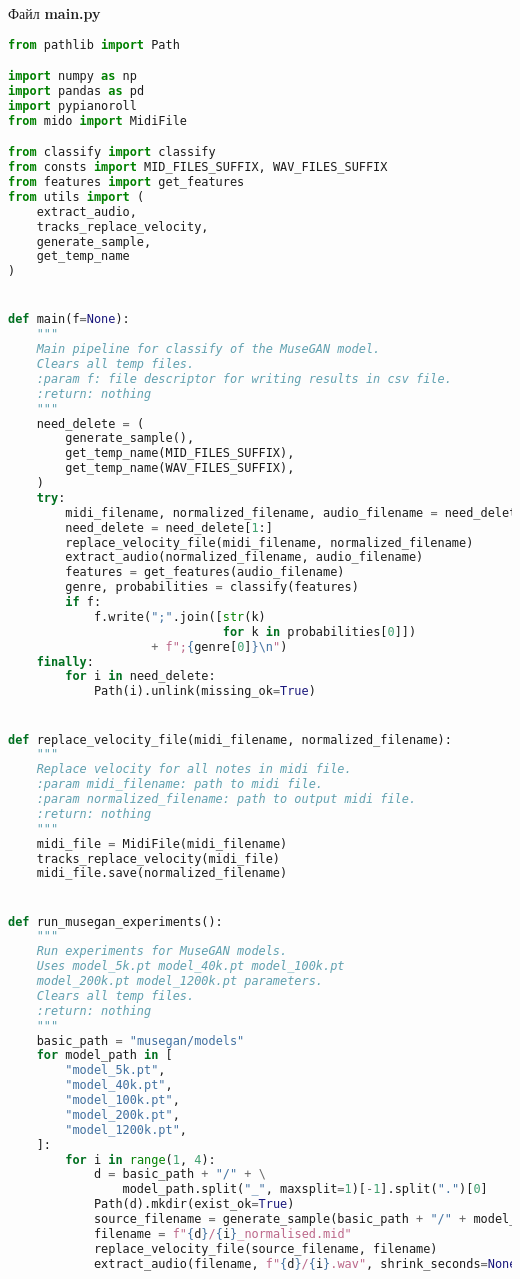 Файл \textbf{main.py}

\begin{lstlisting}[language=Python]
from pathlib import Path

import numpy as np
import pandas as pd
import pypianoroll
from mido import MidiFile

from classify import classify
from consts import MID_FILES_SUFFIX, WAV_FILES_SUFFIX
from features import get_features
from utils import (
    extract_audio,
    tracks_replace_velocity,
    generate_sample,
    get_temp_name
)


def main(f=None):
    """
    Main pipeline for classify of the MuseGAN model.
    Clears all temp files.
    :param f: file descriptor for writing results in csv file.
    :return: nothing
    """
    need_delete = (
        generate_sample(),
        get_temp_name(MID_FILES_SUFFIX),
        get_temp_name(WAV_FILES_SUFFIX),
    )
    try:
        midi_filename, normalized_filename, audio_filename = need_delete
        need_delete = need_delete[1:]
        replace_velocity_file(midi_filename, normalized_filename)
        extract_audio(normalized_filename, audio_filename)
        features = get_features(audio_filename)
        genre, probabilities = classify(features)
        if f:
            f.write(";".join([str(k)
                              for k in probabilities[0]])
                    + f";{genre[0]}\n")
    finally:
        for i in need_delete:
            Path(i).unlink(missing_ok=True)


def replace_velocity_file(midi_filename, normalized_filename):
    """
    Replace velocity for all notes in midi file.
    :param midi_filename: path to midi file.
    :param normalized_filename: path to output midi file.
    :return: nothing
    """
    midi_file = MidiFile(midi_filename)
    tracks_replace_velocity(midi_file)
    midi_file.save(normalized_filename)


def run_musegan_experiments():
    """
    Run experiments for MuseGAN models.
    Uses model_5k.pt model_40k.pt model_100k.pt
    model_200k.pt model_1200k.pt parameters.
    Clears all temp files.
    :return: nothing
    """
    basic_path = "musegan/models"
    for model_path in [
        "model_5k.pt",
        "model_40k.pt",
        "model_100k.pt",
        "model_200k.pt",
        "model_1200k.pt",
    ]:
        for i in range(1, 4):
            d = basic_path + "/" + \
                model_path.split("_", maxsplit=1)[-1].split(".")[0]
            Path(d).mkdir(exist_ok=True)
            source_filename = generate_sample(basic_path + "/" + model_path)
            filename = f"{d}/{i}_normalised.mid"
            replace_velocity_file(source_filename, filename)
            extract_audio(filename, f"{d}/{i}.wav", shrink_seconds=None)


\end{lstlisting}
